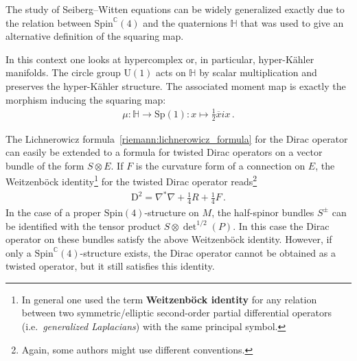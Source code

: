     \begin{remark}
        The study of Seiberg--Witten equations can be widely generalized exactly due to the relation between $\mathrm{Spin}^{\mathbb{C}}(4)$ and the quaternions $\mathbb{H}$ that was used to give an alternative definition of the squaring map.

        In this context one looks at hypercomplex or, in particular, hyper-K\"ahler manifolds. The circle group $\mathrm{U}(1)$ acts on $\mathbb{H}$ by scalar multiplication and preserves the hyper-K\"ahler structure. The associated moment map is exactly the morphism inducing the squaring map:
        \begin{gather}
            \mu:\mathbb{H}\rightarrow\mathrm{Sp}(1):x\mapsto\frac{1}{2}\overline{x}ix\,.
        \end{gather}
    \end{remark}

    \begin{property}
        The Lichnerowicz formula~\ref{riemann:lichnerowicz_formula} for the Dirac operator can easily be extended to a formula for twisted Dirac operators on a vector bundle of the form $S\otimes E$. If $F$ is the curvature form of a connection on $E$, the Weitzenb\"ock identity\footnote{In general one used the term \textbf{Weitzenb\"ock identity} for any relation between two symmetric/elliptic second-order partial differential operators (i.e.~\textit{generalized Laplacians}) with the same principal symbol.} for the twisted Dirac operator reads\footnote{Again, some authors might use different conventions.}
        \begin{gather}
            \mathrm{D}^2 = \nabla^*\nabla+\frac{1}{4}R+\frac{1}{4}F\,.
        \end{gather}
        In the case of a proper $\mathrm{Spin}(4)$-structure on $M$, the half-spinor bundles $S^\pm$ can be identified with the tensor product $S\otimes\det^{1/2}(P)$. In this case the Dirac operator on these bundles satisfy the above Weitzenb\"ock identity. However, if only a $\mathrm{Spin}^{\mathbb{C}}(4)$-structure exists, the Dirac operator cannot be obtained as a twisted operator, but it still satisfies this identity.
    \end{property}

